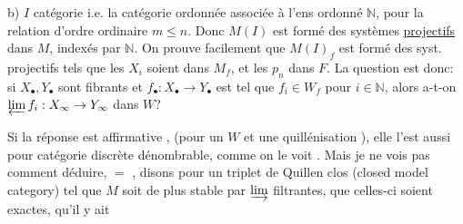 b) $I$ catégorie
i.e. la catégorie ordonnée associée à l'ens ordonné $\mathbb{N}$, pour la relation d'ordre ordinaire $m\leq n$. Donc $M(I)$ est formé des systèmes \uline{projectifs} dans $M$, indexés par $\mathbb{N}$.  On prouve facilement  que $M(I)_f$ est formé des syst. projectifs
tels que les $X_i$ soient dans $M_f$, et les $p_n$ dans $F$. La question est donc: si $X_\bullet,Y_\bullet$ sont fibrants et $f_\bullet:X_\bullet\to Y_\bullet$ est tel que $f_i\in W_f$ pour $i\in\mathbb{N}$, alors a-t-on $\varprojlim f_i:X_\infty\to Y_\infty$ dans $W$?

Si  la réponse est affirmative , (pour un $W$ et une quillénisation ), elle l'est aussi pour  catégorie discrète dénombrable, comme on le voit . Mais je ne vois pas comment déduire, $=$ , disons pour un triplet de Quillen clos (closed model category) tel que $M$ soit de plus stable par $\varinjlim$ filtrantes, que celles-ci soient exactes, qu'il y ait
